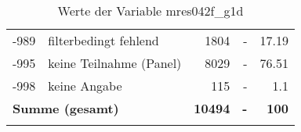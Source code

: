 \begin{longtable}{Xlrrr}
       -989 & filterbedingt fehlend & \num{1804} & - & \num[round-mode=places,round-precision=2]{17.19} \\

       -995 & keine Teilnahme (Panel) & \num{8029} & - & \num[round-mode=places,round-precision=2]{76.51} \\

       -998 & keine Angabe & \num{115} & - & \num[round-mode=places,round-precision=2]{1.1} \\

     \midrule
     \multicolumn{2}{l}{\textbf{Summe (gesamt)}} & \textbf{\num{10494}} & \textbf{-} & \textbf{\num{100}} \\
     \bottomrule
     \caption{Werte der Variable mres042f\_g1d}
     \end{longtable}
     
